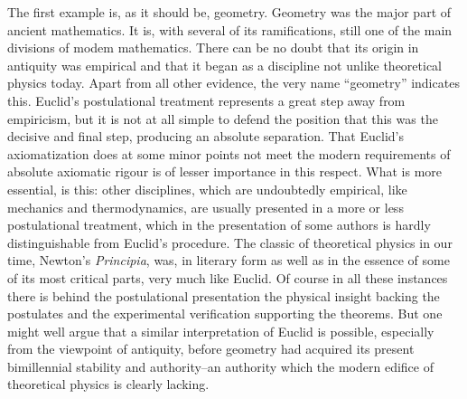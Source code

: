 \documentclass{article}
\begin{document}
The first example is, as it should be, geometry. Geometry was the major part of ancient mathematics. It is, with several of its ramifications, still one of the main divisions of modem mathematics. There can be no doubt that its origin in antiquity was empirical and that it began as a discipline not unlike theoretical physics today. Apart from all other evidence, the very name ``geometry'' indicates this. Euclid's postulational treatment represents a great step away from empiricism, but it is not at all simple to defend the position that this was the decisive and final step, producing an absolute separation. That Euclid's axiomatization does at some minor points not meet the modern requirements of absolute axiomatic rigour is of lesser importance in this respect. What is more essential, is this: other disciplines, which are undoubtedly empirical, like mechanics and thermodynamics, are usually presented in a more or less postulational treatment, which in the presentation of some authors is hardly distinguishable from Euclid's procedure. The classic of theoretical physics in our time, Newton's \textit{Principia}, was, in literary form as well as in the essence of some of its most critical parts, very much like Euclid. Of course in all these instances there is behind the postulational presentation the physical insight backing the postulates and the experimental verification supporting the theorems. But one might well argue that a similar interpretation of Euclid is possible, especially from the viewpoint of antiquity, before geometry had acquired its present bimillennial stability and authority--an authority which the modern edifice of theoretical physics is clearly lacking.
\end{document}
